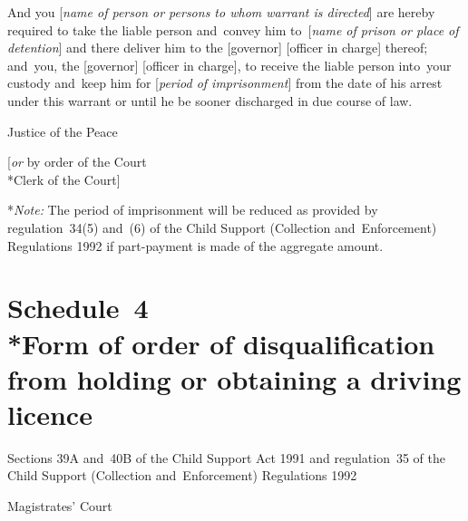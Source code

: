 \documentclass[12pt,a4paper]{article}
\begin{document}
\medskip

And you [\emph{name of person or persons to whom warrant is directed}] are hereby required to take the liable person and~convey him to~[\emph{name of prison or place of detention}] and there deliver him to the [governor] [officer in charge] thereof; and~you, the [governor] [officer in charge], to receive the liable person into~your custody and~keep him for [\emph{period of imprisonment}] from the date of his arrest under this warrant or until he be sooner discharged in due course of law.

\medskip

{\raggedleft Justice of the Peace

\medskip

[\emph{or} by order of the Court\\*Clerk of the Court]

}

\medskip

*\emph{Note:} The period of imprisonment will be reduced as provided by regulation~34(5) and~(6) of the Child Support (Collection and~Enforcement) Regulations 1992 if part-payment is made of the aggregate amount.


\part[Schedule~4 --- Form of order of disqualification from holding or obtaining a driving licence]{Schedule~4\\*Form of order of disqualification from holding or obtaining a driving licence}

\renewcommand\parthead{--- Schedule~4}


\medskip

\noindent
Sections 39A and~40B of the Child Support Act 1991 and regulation~35 of the Child Support (Collection and~Enforcement) Regulations 1992

\medskip

{\raggedleft \hspace{0.5\linewidth}\dotfill Magistrates' Court

}
\end{document}
